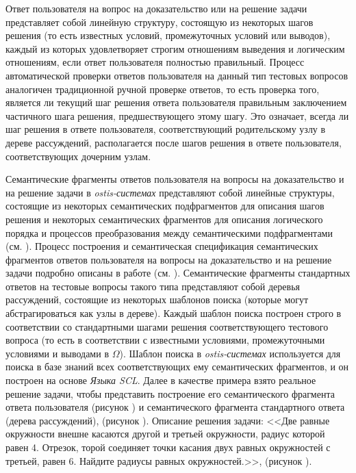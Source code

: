 Ответ пользователя на вопрос на доказательство или на решение задачи представляет собой линейную структуру, состоящую из некоторых шагов решения (то есть известных условий, промежуточных условий или выводов), каждый из которых удовлетворяет строгим отношениям выведения и логическим отношениям, если ответ пользователя полностью правильный. Процесс автоматической проверки ответов пользователя на данный тип тестовых вопросов аналогичен традиционной ручной проверке ответов, то есть проверка того, является ли текущий шаг решения ответа пользователя правильным заключением частичного шага решения, предшествующего этому шагу. Это означает, всегда ли шаг решения в ответе пользователя, соответствующий родительскому узлу в дереве рассуждений, располагается после шагов решения в ответе пользователя, соответствующих дочерним узлам.

Семантические фрагменты ответов пользователя на вопросы на доказательство и на решение задачи в \textit{ostis-системах} представляют собой линейные структуры, состоящие из некоторых семантических подфрагментов для описания шагов решения и некоторых семантических фрагментов для описания логического порядка и процессов преобразования между семантическими подфрагментами (см. ). Процесс построения и семантическая спецификация семантических фрагментов ответов пользователя на вопросы на доказательство и на решение задачи подробно описаны в работе (см. ). Семантические фрагменты стандартных ответов на тестовые вопросы такого типа представляют собой деревья рассуждений, состоящие из некоторых шаблонов поиска (которые могут абстрагироваться как узлы в дереве). Каждый шаблон поиска построен строго в соответствии со стандартными шагами решения соответствующего тестового вопроса (то есть в соответствии с известными условиями, промежуточными условиями и выводами в $\Omega $). Шаблон поиска в \textit{ostis-системах} используется для поиска в базе знаний всех соответствующих ему семантических фрагментов, и он построен на основе \textit{Языка SCL}. Далее в качестве примера взято реальное решение задачи, чтобы представить построение его семантического фрагмента ответа пользователя (рисунок \textit{}) и семантического фрагмента стандартного ответа (дерева рассуждений), (рисунок \textit{}). Описание решения задачи: <<Две равные окружности внешне касаются другой и третьей окружности, радиус которой равен 4. Отрезок, торой соединяет точки касания двух равных окружностей с третьей, равен 6. Найдите радиусы равных окружностей.>>, (рисунок \textit{}).

